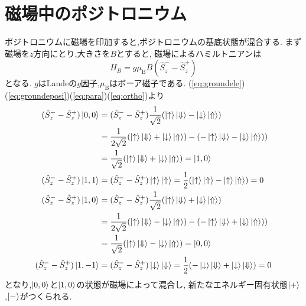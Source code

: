 \section{磁場中のポジトロニウム}
ポジトロニウムに磁場を印加すると,ポジトロニウムの基底状態が混合する.
まず磁場を$z$方向にとり,大きさを$B$とすると,
磁場によるハミルトニアンは
\begin{equation}
	\nonumber
	\hat{H}_{B} = g\mu_{\mathrm{B}}B(\hat{S}^{-}_{z} - \hat{S}^{+}_{z})
\end{equation}
となる.
$g$はLandeの$g$因子,$\mu_{\mathrm{B}}$はボーア磁子である.%
(\ref{eq:groundele})(\ref{eq:groundeposi})(\ref{eq:para})(\ref{eq:ortho})より
\begin{align}
	\nonumber
(\hat{S}^{-}_{z} - \hat{S}^{+}_{z})\ket{0,0} &= (\hat{S}^{-}_{z} - \hat{S}^{+}_{z})\frac{1}{\sqrt{2}} ( \ket{ \uparrow } \ket{ \Downarrow } - \ket{ \downarrow } \ket{ \Uparrow }) \notag \\
	&= \frac{1}{2\sqrt{2}} ( \ket{ \uparrow } \ket{ \Downarrow } + \ket{ \downarrow } \ket{ \Uparrow } ) - ( - \ket{ \uparrow } \ket{ \Downarrow } - \ket{ \downarrow } \ket{ \Uparrow } )) \notag \\
&= \frac{1}{\sqrt{2}} ( \ket{ \uparrow } \ket{ \Downarrow } + \ket{ \downarrow } \ket{ \Uparrow }) = \ket{1,0} \\
(\hat{S}^{-}_{z} - \hat{S}^{+}_{z})\ket{1,1}
&= (\hat{S}^{-}_{z} - \hat{S}^{+}_{z})\ket{ \uparrow } \ket{ \Uparrow }
=\frac{1}{2}( \ket{ \uparrow } \ket{ \Uparrow } - \ket{ \uparrow } \ket{ \Uparrow } )
= 0 \\
(\hat{S}^{-}_{z} - \hat{S}^{+}_{z})\ket{1,0} &= (\hat{S}^{-}_{z} - \hat{S}^{+}_{z})\frac{1}{\sqrt{2}} ( \ket{ \uparrow } \ket{ \Downarrow } + \ket{ \downarrow } \ket{ \Uparrow }) \notag \\
	&= \frac{1}{2\sqrt{2}} ( \ket{ \uparrow } \ket{ \Downarrow } - \ket{ \downarrow } \ket{ \Uparrow } ) - ( - \ket{ \uparrow } \ket{ \Downarrow } + \ket{ \downarrow } \ket{ \Uparrow } )) \notag \\
&= \frac{1}{\sqrt{2}} ( \ket{ \uparrow } \ket{ \Downarrow } - \ket{ \downarrow } \ket{ \Uparrow }) = \ket{0,0} \\
(\hat{S}^{-}_{z} - \hat{S}^{+}_{z})\ket{1,-1}
&= (\hat{S}^{-}_{z} - \hat{S}^{+}_{z})\ket{ \downarrow } \ket{ \Downarrow }
=\frac{1}{2}( - \ket{ \downarrow } \ket{ \Downarrow } + \ket{ \downarrow } \ket{ \Downarrow } )
= 0
\end{align}
となり,$\ket{0,0}$と$\ket{1,0}$の状態が磁場によって混合し,
新たなエネルギー固有状態$\ket{+}$,$\ket{-}$がつくられる.
